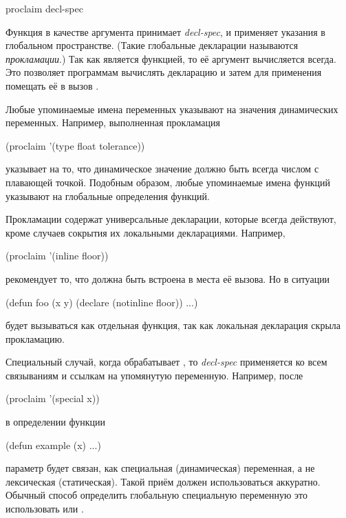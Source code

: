 \begin{defun}[Функция]
proclaim decl-spec

Функция  в качестве аргумента принимает \emph{decl-spec}, и
применяет указания в глобальном пространстве. (Такие глобальные декларации
называются \emph{прокламации}.)
Так как  является функцией, то её аргумент вычисляется всегда.
Это позволяет программам вычислять декларацию и затем для применения помещать её
в вызов .

Любые упоминаемые имена переменных указывают на значения
динамических переменных. Например, выполненная прокламация
\begin{lisp}
(proclaim '(type float tolerance))
\end{lisp}
указывает на то, что динамическое значение  должно быть всегда
числом с плавающей точкой.
Подобным образом, любые упоминаемые имена функций указывают на глобальные
определения функций.

Прокламации содержат универсальные декларации, которые всегда действуют, кроме
случаев сокрытия их локальными декларациями. Например,
\begin{lisp}
(proclaim '(inline floor))
\end{lisp}
рекомендует то, что  должна быть встроена в места её вызова. Но в
ситуации 
\begin{lisp}
(defun foo (x y) (declare (notinline floor)) ...)
\end{lisp}
 будет вызываться как отдельная функция, так как локальная декларация
скрыла прокламацию.

Специальный случай, когда  обрабатывает , то
\emph{decl-spec} применяется ко всем связываниям и ссылкам на упомянутую 
переменную.
Например, после
\begin{lisp}
(proclaim '(special x))
\end{lisp}
в определении функции
\begin{lisp}
(defun example (x) ...)
\end{lisp}
параметр  будет связан, как специальная (динамическая) переменная, а не
лексическая (статическая). Такой приём должен использоваться аккуратно. Обычный
способ определить глобальную специальную переменную это использовать
 или .
\end{defun}

